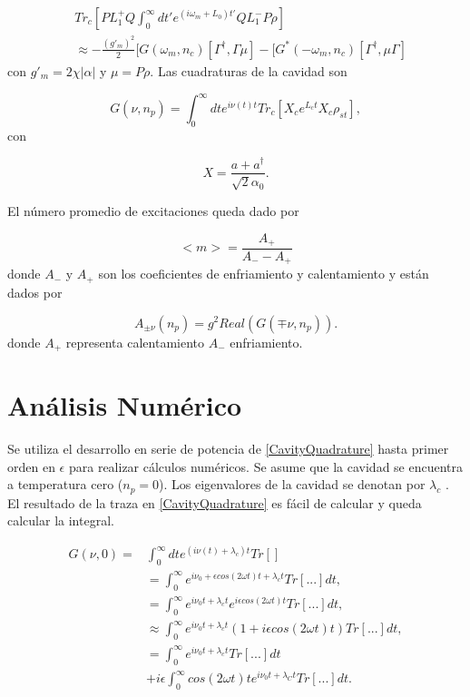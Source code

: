 \documentclass[10pt,a4paper]{report}
\begin{document}
\begin{align}
&Tr_c[PL^+_1Q \int_0^\infty dt' e^{(i\omega_m +L_0)t'}QL_1^- P\rho] \\
&\approx -\frac{(g'_m)^2}{2}[G(\omega_m,n_c)[\Gamma^\dagger,\Gamma\mu]-[G^*(-\omega_m,n_c)[\Gamma^\dagger,\mu\Gamma] \nonumber
\end{align} con $g'_m = 2\chi|\alpha|$ y $\mu = P\rho$. Las cuadraturas de la cavidad son

\begin{equation} \label{CavityQuadrature}
G(\nu,n_p) = \int_0^\infty dt e^{i\nu(t) t}Tr_c[X_c e^{L_c t} X_c \rho_{st}],
\end{equation} con 


\begin{equation}
X = \frac{a + a^\dagger}{\sqrt{2}\alpha_0}.
\end{equation}

El número promedio de excitaciones queda dado por

\begin{equation}
<m> = \frac{A_+}{A_- - A_+}
\end{equation} donde $A_-$ y $A_+$ son los coeficientes de enfriamiento y calentamiento y están dados por


\begin{equation}
A_{\pm \nu}(n_p) = g^2Real(G(\mp \nu,n_p)).
\end{equation} donde $A_+$ representa calentamiento $A_-$ enfriamiento.


\section{Análisis Numérico}

Se utiliza el desarrollo en serie de potencia de
\eqref{CavityQuadrature} hasta primer orden en $\epsilon$ para
realizar cálculos numéricos. Se asume que la cavidad se encuentra a
temperatura cero ($n_p=0$). Los eigenvalores de la cavidad se denotan
por $\lambda_c$ . El resultado de la traza en \eqref{CavityQuadrature} es fácil de calcular y queda calcular la integral.

\begin{align}
G(\nu,0)=&\int_0^\infty dt e^{(i\nu(t)+\lambda_c) t}Tr[]\\
&= \int_0^\infty e^{i \nu_0 + \epsilon cos(2\omega t) t + \lambda_c t} Tr[...]dt, \\
&=\int_0^\infty e^{i \nu_0 t + \lambda_c t}e^{i \epsilon cos(2\omega t)t} Tr[...]dt, \\
&\approx \int_0^\infty e^{i \nu_0 t + \lambda_c t}(1+i \epsilon cos(2\omega t)t) Tr[...]dt, \\
&=\int_0^\infty e^{i \nu_0 t + \lambda_c t}Tr[...]dt\\
&+i\epsilon\int_0^\infty cos(2\omega t)t e^{i \nu_0 t + \lambda_C t}Tr[...]dt.
\end{align}
\end{document}
